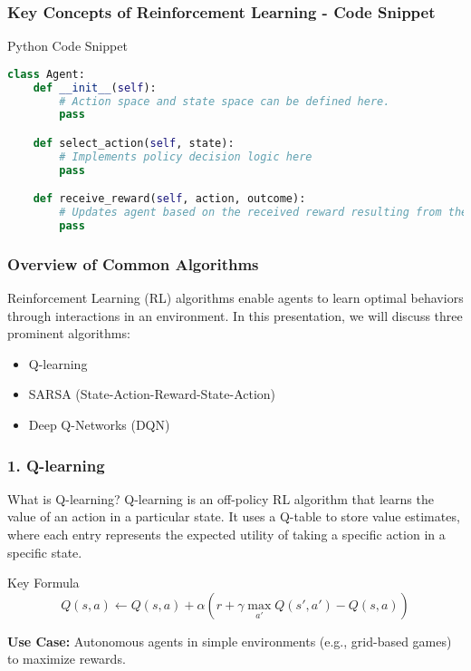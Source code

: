 \documentclass{beamer}
\begin{document}
\begin{frame}[fragile]
    \frametitle{Key Concepts of Reinforcement Learning - Code Snippet}
    \begin{block}{Python Code Snippet}
        \begin{lstlisting}[language=Python]
class Agent:
    def __init__(self):
        # Action space and state space can be defined here.
        pass

    def select_action(self, state):
        # Implements policy decision logic here
        pass

    def receive_reward(self, action, outcome):
        # Updates agent based on the received reward resulting from the action
        pass
        \end{lstlisting}
    \end{block}
\end{frame}

\begin{frame}[fragile]
    \frametitle{Overview of Common Algorithms}
    Reinforcement Learning (RL) algorithms enable agents to learn optimal behaviors through interactions in an environment. In this presentation, we will discuss three prominent algorithms:
    \begin{itemize}
        \item Q-learning
        \item SARSA (State-Action-Reward-State-Action)
        \item Deep Q-Networks (DQN)
    \end{itemize}
\end{frame}

\begin{frame}[fragile]
    \frametitle{1. Q-learning}
    \begin{block}{What is Q-learning?}
        Q-learning is an off-policy RL algorithm that learns the value of an action in a particular state. It uses a Q-table to store value estimates, where each entry represents the expected utility of taking a specific action in a specific state.
    \end{block}
    
    \begin{block}{Key Formula}
        \begin{equation}
        Q(s, a) \leftarrow Q(s, a) + \alpha \left( r + \gamma \max_{a'} Q(s', a') - Q(s, a) \right)
        \end{equation}
    \end{block}

    \textbf{Use Case:} Autonomous agents in simple environments (e.g., grid-based games) to maximize rewards.
\end{frame}
\end{document}

